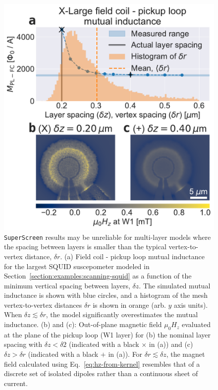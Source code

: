 \documentclass[final,3p,times,twocolumn]{elsarticle}
\newcommand{\inline}[1]{\texttt{#1}\xspace}
\newcommand{\SuperScreen}{\inline{SuperScreen}}
\newcounter{bla}
\begin{document}
\begin{figure}[t]
    \centering
    \includegraphics[width=\linewidth]{examples/images/xlarge-dz-dr.pdf}
    \caption{\SuperScreen results may be unreliable for multi-layer models where the spacing between layers is smaller than the typical vertex-to-vertex distance, $\delta r$. (a) Field coil - pickup loop mutual inductance for the largest SQUID suscepometer modeled in Section~\ref{section:examples:scanning-squid} as a function of the minimum vertical spacing between layers, $\delta z$. The simulated mutual inductance is shown with blue circles, and a histogram of the mesh vertex-to-vertex distances $\delta r$ is shown in orange (arb. $y$ axis units). When $\delta z\lesssim\delta r$, the model significantly overestimates the mutual inductance. (b) and (c): Out-of-plane magnetic field $\mu_0H_z$ evaluated at the plane of the pickup loop (W1 layer) for (b) the nominal layer spacing with $\delta z<\delta 2$ (indicated with a black $\times$ in (a)) and (c) $\delta z > \delta r$ (indicated with a black $+$ in (a)). For $\delta r\lesssim\delta z$, the magnet field calculated using Eq.~\ref{eq:hz-from-kernel} resembles that of a discrete set of isolated dipoles rather than a continuous sheet of current.}
    \label{fig:xlarge-dz-dr}
\end{figure}
\end{document}
